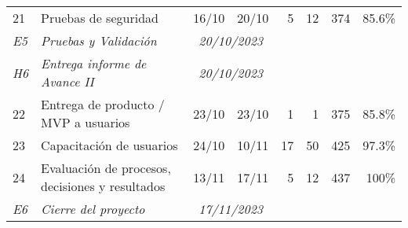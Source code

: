 \begin{longtable}[c]{llccrrrr}
	{\color[HTML]{656565} 21}              & {\color[HTML]{656565} Pruebas de seguridad}                            & {\color[HTML]{656565} 16/10}                     & {\color[HTML]{656565} 20/10}                     & {\color[HTML]{656565} 5}          & {\color[HTML]{656565} 12}          & {\color[HTML]{656565} 374}           & {\color[HTML]{656565} 85.6\%}       \\
	\textit{E5}                            & \textit{Pruebas y Validación}                                          & \multicolumn{2}{c}{\textit{20/10/2023}}          & \textit{}                                        & \textit{}                         & \textit{}                          & \textit{}                                                                  \\
	\textit{H6}                            & \textit{Entrega informe de Avance II}                                  & \multicolumn{2}{c}{\textit{20/10/2023}}          & \textit{}                                        & \textit{}                         & \textit{}                          & \textit{}                                                                  \\
	{\color[HTML]{656565} 22}              & {\color[HTML]{656565} Entrega de producto / MVP a usuarios}            & {\color[HTML]{656565} 23/10}                     & {\color[HTML]{656565} 23/10}                     & {\color[HTML]{656565} 1}          & {\color[HTML]{656565} 1}           & {\color[HTML]{656565} 375}           & {\color[HTML]{656565} 85.8\%}       \\
	{\color[HTML]{656565} 23}              & {\color[HTML]{656565} Capacitación de usuarios}                        & {\color[HTML]{656565} 24/10}                     & {\color[HTML]{656565} 10/11}                     & {\color[HTML]{656565} 17}         & {\color[HTML]{656565} 50}          & {\color[HTML]{656565} 425}           & {\color[HTML]{656565} 97.3\%}       \\
	{\color[HTML]{656565} 24}              & {\color[HTML]{656565} Evaluación de procesos, decisiones y resultados} & {\color[HTML]{656565} 13/11}                     & {\color[HTML]{656565} 17/11}                     & {\color[HTML]{656565} 5}          & {\color[HTML]{656565} 12}          & {\color[HTML]{656565} 437}           & {\color[HTML]{656565} 100\%}        \\
	\textit{E6}                            & \textit{Cierre del proyecto}                                           & \multicolumn{2}{c}{\textit{17/11/2023}}          & \textit{}                                        & \textit{}                         & \textit{}                          & \textit{}                                                                  \\

\end{longtable}
